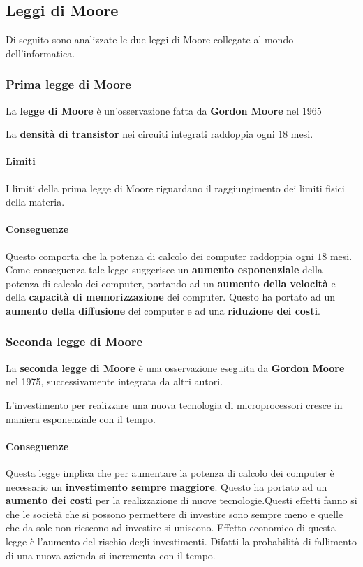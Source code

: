     \subsection{Leggi di Moore}
        Di seguito sono analizzate le due leggi di Moore collegate al mondo dell'informatica.
        \subsubsection{Prima legge di Moore}
            La \textbf{legge di Moore} è un'osservazione fatta da \textbf{Gordon Moore} nel 1965
            \begin{definition}
                La \textbf{densità di transistor} nei circuiti integrati raddoppia ogni $18$ mesi.
            \end{definition}
            \paragraph{Limiti} I limiti della prima legge di Moore riguardano il raggiungimento dei limiti fisici della materia.
            \paragraph{Conseguenze} 
            Questo comporta che la potenza di calcolo dei computer raddoppia ogni $18$ mesi. Come conseguenza tale legge suggerisce un \textbf{aumento esponenziale} della potenza di calcolo dei computer, portando ad un \textbf{aumento della velocità} e della \textbf{capacità di memorizzazione} dei computer. Questo ha portato ad un \textbf{aumento della diffusione} dei computer e ad una \textbf{riduzione dei costi}.
        \subsubsection{Seconda legge di Moore}
            La \textbf{seconda legge di Moore} è una osservazione eseguita da \textbf{Gordon Moore} nel 1975, successivamente integrata da altri autori.
            \begin{definition}
                L'investimento per realizzare una nuova tecnologia di microprocessori cresce in maniera esponenziale con il tempo.
            \end{definition}
            \paragraph{Conseguenze} Questa legge implica che per aumentare la potenza di calcolo dei computer è necessario un \textbf{investimento sempre maggiore}. Questo ha portato ad un \textbf{aumento dei costi} per la realizzazione di nuove tecnologie.\newline Questi effetti fanno sì che le società che si possono permettere di investire sono sempre meno e quelle che da sole non riescono ad investire si uniscono. Effetto economico di questa legge è l'aumento del rischio degli investimenti. Difatti la probabilità di fallimento di una nuova azienda si incrementa con il tempo.
